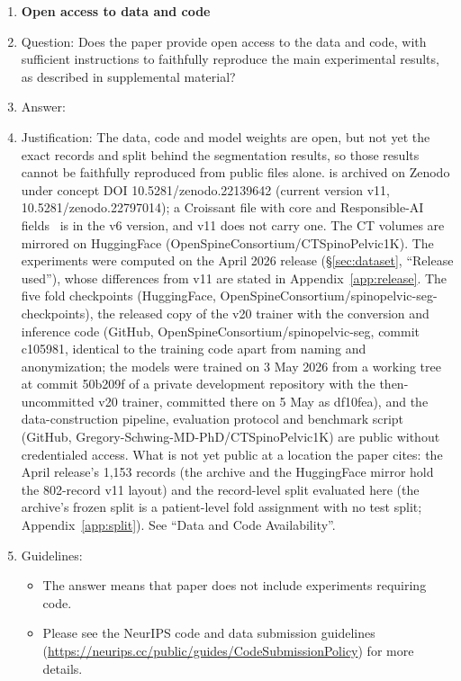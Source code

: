 \begin{enumerate}
\item {\bf Open access to data and code}
    \item[] Question: Does the paper provide open access to the data and code, with sufficient instructions to faithfully reproduce the main experimental results, as described in supplemental material?
    \item[] Answer: \answerNo{}
    \item[] Justification: The data, code and model weights are open, but not yet the exact records and split behind the segmentation results, so those results cannot be faithfully reproduced from public files alone. \dataset{} is archived on Zenodo under concept DOI 10.5281/zenodo.22139642 (current version v11, 10.5281/zenodo.22797014); a Croissant file with core and Responsible-AI fields~\citep{Akhtar2024Croissant:Datasets} is in the v6 version, and v11 does not carry one. The CT volumes are mirrored on HuggingFace (OpenSpineConsortium/CTSpinoPelvic1K). The experiments were computed on the April 2026 release (\S\ref{sec:dataset}, ``Release used''), whose differences from v11 are stated in Appendix~\ref{app:release}. The five fold checkpoints (HuggingFace, OpenSpineConsortium/spinopelvic-seg-checkpoints), the released copy of the v20 trainer with the conversion and inference code (GitHub, OpenSpineConsortium/spinopelvic-seg, commit c105981, identical to the training code apart from naming and anonymization; the models were trained on 3 May 2026 from a working tree at commit 50b209f of a private development repository with the then-uncommitted v20 trainer, committed there on 5 May as df10fea), and the data-construction pipeline, evaluation protocol and \TS{} benchmark script (GitHub, Gregory-Schwing-MD-PhD/CTSpinoPelvic1K) are public without credentialed access. What is not yet public at a location the paper cites: the April release's 1{,}153 records (the archive and the HuggingFace mirror hold the 802-record v11 layout) and the record-level split evaluated here (the archive's frozen split is a patient-level fold assignment with no test split; Appendix~\ref{app:split}). See ``Data and Code Availability''.
    \item[] Guidelines:
    \begin{itemize}
        \item The answer \answerNA{} means that paper does not include experiments requiring code.
        \item Please see the NeurIPS code and data submission guidelines (\url{https://neurips.cc/public/guides/CodeSubmissionPolicy}) for more details.

\end{itemize}
\end{enumerate}
